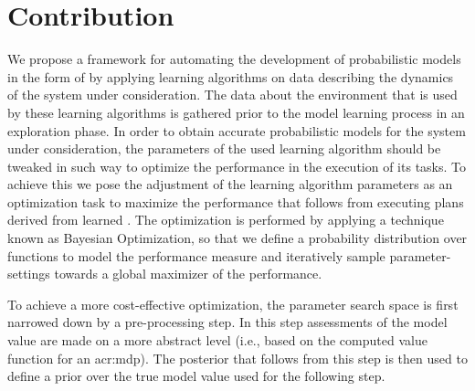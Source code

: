 \section{Contribution}
\label{sec:contribution}

We propose a framework for automating the development of probabilistic models in the form of  by applying learning algorithms on data describing the dynamics of the system under consideration.
The data about the environment that is used by these learning algorithms is gathered prior to the model learning process in an exploration phase.
In order to obtain accurate probabilistic models for the system under consideration, the parameters of the used learning algorithm should be tweaked in such way to optimize the performance in the execution of its tasks.
To achieve this we pose the adjustment of the learning algorithm parameters as an optimization task to maximize the performance that follows from executing plans derived from learned .
The optimization is performed by applying a technique known as Bayesian Optimization, so that we define a probability distribution over functions to model the performance measure and iteratively sample parameter-settings towards a global maximizer of the performance.


To achieve a more cost-effective optimization, the parameter search space is first narrowed down by a pre-processing step.
In this step assessments of the model value are made on a more abstract level (i.e., based on the computed value function for an \acrshort{acr:mdp}).
The posterior that follows from this step is then used to define a prior over the true model value used for the following step.

